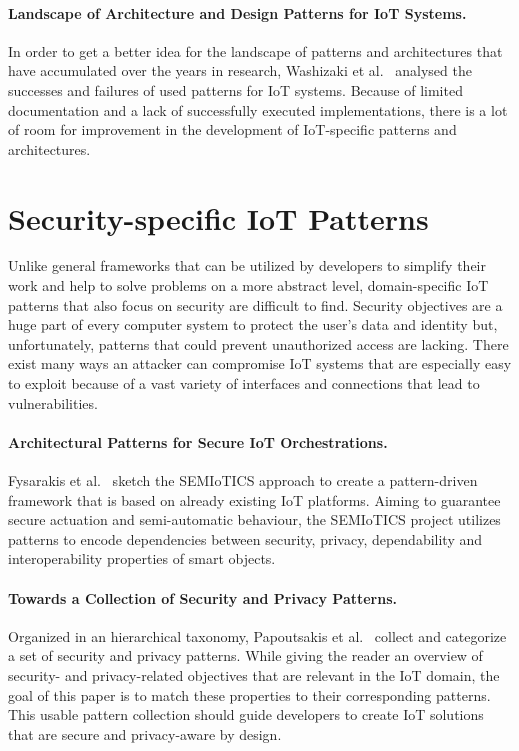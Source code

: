 \paragraph{Landscape of Architecture and Design Patterns for IoT Systems.} In order to get a better idea for the landscape of patterns and architectures that have accumulated over the years in research, Washizaki et al.~\cite{Washizaki2019, Washizaki2020} analysed the successes and failures of used patterns for IoT systems. Because of limited documentation and a lack of successfully executed implementations, there is a lot of room for improvement in the development of IoT-specific patterns and architectures.  


\section{Security-specific IoT Patterns}
Unlike general frameworks that can be utilized by developers to simplify their work and help to solve problems on a more abstract level, domain-specific IoT patterns that also focus on security are difficult to find. Security objectives are a huge part of every computer system to protect the user's data and identity but, unfortunately, patterns that could prevent unauthorized access are lacking. There exist many ways an attacker can compromise IoT systems that are especially easy to exploit because of a vast variety of interfaces and connections that lead to vulnerabilities. 

\paragraph{Architectural Patterns for Secure IoT Orchestrations.} Fysarakis et al.~\cite{Fysarakis2019} sketch the SEMIoTICS approach to create a pattern-driven framework that is based on already existing IoT platforms. Aiming to guarantee secure actuation and semi-automatic behaviour, the SEMIoTICS project utilizes patterns to encode dependencies between security, privacy, dependability and interoperability properties of smart objects.

\paragraph{Towards a Collection of Security and Privacy Patterns.} Organized in an hierarchical taxonomy, Papoutsakis et al.~\cite{Papoutsakis2021} collect and categorize a set of security and privacy patterns. While giving the reader an overview of security- and privacy-related objectives that are relevant in the IoT domain, the goal of this paper is to match these properties to their corresponding patterns. This usable pattern collection should guide developers to create IoT solutions that are secure and privacy-aware by design.

